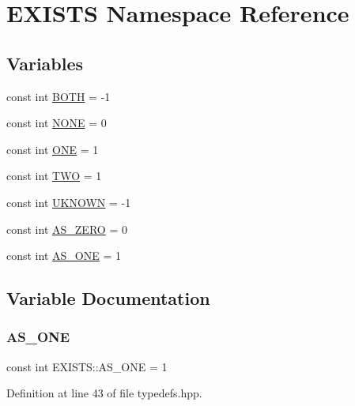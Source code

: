 \hypertarget{namespace_e_x_i_s_t_s}{}\section{E\+X\+I\+S\+TS Namespace Reference}
\label{namespace_e_x_i_s_t_s}
\subsection*{Variables}
\begin{DoxyCompactItemize}
\item 
const int \hyperlink{namespace_e_x_i_s_t_s_a256db431572e1e7f26f8dfa6c9cae9bd}{B\+O\+TH} = -\/1
\item 
const int \hyperlink{namespace_e_x_i_s_t_s_a2f75d813424980b47f3e7c9608fb8416}{N\+O\+NE} = 0
\item 
const int \hyperlink{namespace_e_x_i_s_t_s_a4c3717397d716d2bbd69d8239b3de033}{O\+NE} = 1
\item 
const int \hyperlink{namespace_e_x_i_s_t_s_ad76d02e8eb6d20715d333b72394b0648}{T\+WO} = 1
\item 
const int \hyperlink{namespace_e_x_i_s_t_s_a81eb362d951445c658942a433afddb97}{U\+K\+N\+O\+WN} = -\/1
\item 
const int \hyperlink{namespace_e_x_i_s_t_s_a03d550dd049f50f852b8fb4caa48238a}{A\+S\+\_\+\+Z\+E\+RO} = 0
\item 
const int \hyperlink{namespace_e_x_i_s_t_s_a735e5ca6565905e84346e3ff62842a0a}{A\+S\+\_\+\+O\+NE} = 1
\end{DoxyCompactItemize}


\subsection{Variable Documentation}
\mbox{\label{namespace_e_x_i_s_t_s_a735e5ca6565905e84346e3ff62842a0a}} 
\subsubsection{\texorpdfstring{A\+S\+\_\+\+O\+NE}{AS\_ONE}}
{\footnotesize\ttfamily const int E\+X\+I\+S\+T\+S\+::\+A\+S\+\_\+\+O\+NE = 1}



Definition at line 43 of file typedefs.\+hpp.

